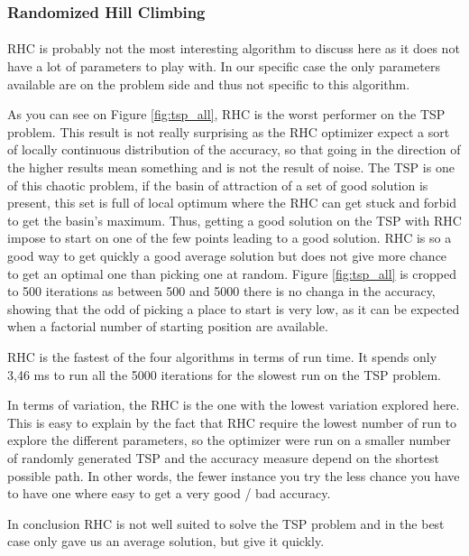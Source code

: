 \documentclass[twocolumn,a4paper,10pt]{article}
\begin{document}
\subsubsection{Randomized Hill Climbing}

\label{tsp_rhc} 

\paragraph{}

RHC is probably not the most interesting algorithm to discuss here
as it does not have a lot of parameters to play with. In our specific
case the only parameters available are on the problem side and thus
not specific to this algorithm.

As you can see on Figure \ref{fig:tsp_all}, RHC is the worst performer
on the TSP problem. This result is not really surprising as the RHC
optimizer expect a sort of locally continuous distribution of the
accuracy, so that going in the direction of the higher results mean
something and is not the result of noise. The TSP is one of this chaotic
problem, if the basin of attraction of a set of good solution is present,
this set is full of local optimum where the RHC can get stuck and
forbid to get the basin's maximum. Thus, getting a good solution on
the TSP with RHC impose to start on one of the few points leading
to a good solution. RHC is so a good way to get quickly a good average
solution but does not give more chance to get an optimal one than
picking one at random. Figure \ref{fig:tsp_all} is cropped to 500
iterations as between 500 and 5000 there is no changa in the accuracy,
showing that the odd of picking a place to start is very low, as it
can be expected when a factorial number of starting position are available.

RHC is the fastest of the four algorithms in terms of run time. It
spends only 3,46 ms to run all the 5000 iterations for the slowest
run on the TSP problem.

In terms of variation, the RHC is the one with the lowest variation
explored here. This is easy to explain by the fact that RHC require
the lowest number of run to explore the different parameters, so the
optimizer were run on a smaller number of randomly generated TSP and
the accuracy measure depend on the shortest possible path. In other
words, the fewer instance you try the less chance you have to have
one where easy to get a very good / bad accuracy.

In conclusion RHC is not well suited to solve the TSP problem and
in the best case only gave us an average solution, but give it quickly. 
\end{document}
